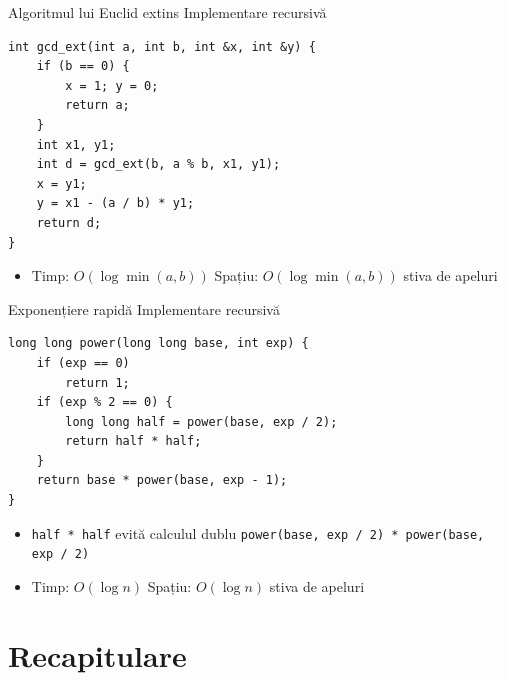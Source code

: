 \documentclass{beamer}
\begin{document}
\begin{frame}{Algoritmul lui Euclid extins \textemdash{} Implementare recursivă}
  \begin{center}
  \begin{lstlisting}
int gcd_ext(int a, int b, int &x, int &y) {
    if (b == 0) {
        x = 1; y = 0;
        return a;
    }
    int x1, y1;
    int d = gcd_ext(b, a % b, x1, y1);
    x = y1;
    y = x1 - (a / b) * y1;
    return d;
}
  \end{lstlisting}
  \end{center}
  \begin{itemize}
    \item Timp: $O(\log \min(a, b))$ \quad Spațiu: $O(\log \min(a, b))$ \textemdash{} stiva de apeluri
  \end{itemize}
\end{frame}

\begin{frame}{Exponențiere rapidă \textemdash{} Implementare recursivă}
  \begin{center}
  \begin{lstlisting}
long long power(long long base, int exp) {
    if (exp == 0)
        return 1;
    if (exp % 2 == 0) {
        long long half = power(base, exp / 2);
        return half * half;
    }
    return base * power(base, exp - 1);
}
  \end{lstlisting}
  \end{center}
  \begin{itemize}
    \item \lstinline|half * half| evită calculul dublu \lstinline[keepspaces=true]|power(base, exp / 2) * power(base, exp / 2)|
    \item Timp: $O(\log n)$ \quad Spațiu: $O(\log n)$ \textemdash{} stiva de apeluri
  \end{itemize}
\end{frame}

\section{Recapitulare}
\end{document}
